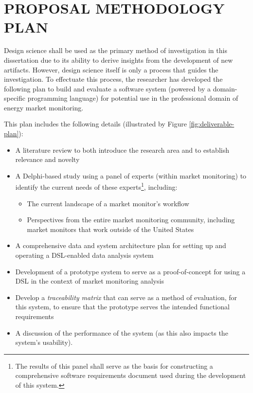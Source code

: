 %
%
%
%  
%



\chapter{\MakeUppercase{Proposal Methodology Plan}}
\label{cha:proposal-methodology}

Design science shall be used as the primary method of investigation in this dissertation due to its ability to derive insights from the development of new artifacts. However, design science itself is only a process that guides the investigation. To effectuate this process, the researcher has developed the following plan to build and evaluate a software system (powered by a domain-specific programming language) for potential use in the professional domain of energy market monitoring.

This plan includes the following details (illustrated by Figure \ref{fig:deliverable-plan}):

\begin{itemize}
    \item{A literature review to both introduce the research area and to establish relevance and novelty}
    \item{A Delphi-based study using a panel of experts (within market monitoring) to identify the current needs of these experts\footnote{The results of this panel shall serve as the basis for constructing a comprehensive software requirements document used during the development of this system.}, including:}
        \begin{itemize}
            \item{The current landscape of a market monitor's workflow}
            \item{Perspectives from the entire market monitoring community, including market monitors that work outside of the United States}
        \end{itemize}
    \item{A comprehensive data and system architecture plan for setting up and operating a DSL-enabled data analysis system}
    \item{Development of a prototype system to serve as a proof-of-concept for using a DSL in the context of market monitoring analysis}
    \item{Develop a \textit{traceability matrix} \cite{pm-traceability-matrix} that can serve as a method of evaluation, for this system, to ensure that the prototype serves the intended functional requirements}
    \item{A discussion of the performance of the system (as this also impacts the system's usability).}
\end{itemize}


